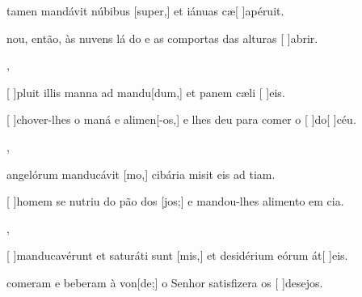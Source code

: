 {  {\item {}tamen mandávit núbibus [super,] et iánuas cæ[ ]{a}{pé}ruit.~\Antiphona}%
    {\item {}nou, então, às nuvens lá do  e as comportas das alturas [ ]{a}{brir}.~\Antiphona},
  {\item {}[ ]{plu}it illis manna ad mandu[dum,] et panem cæli [ ]{e}is.~\Antiphona}%
    {\item {}[ ]{cho}ver-lhes o maná e alimen[-os,] e lhes deu para comer o [ ]{do}[ ]{céu}.~\Antiphona},
  {\item {} angelórum manducávit [mo,] cibária misit eis ad tiam.~\Antiphona}%
    {\item {}[ ]{ho}mem se nutriu do pão dos [jos;] e mandou-lhes alimento em cia.~\Antiphona},
  {\item {}[ ]{man}ducavérunt et saturáti sunt [mis,] et desidérium eórum át[ ]{e}is.~\Antiphona}%
    {\item {} comeram e beberam à von[de;] o Senhor satisfizera os [ ]{de}{se}jos.~\Antiphona}
}
